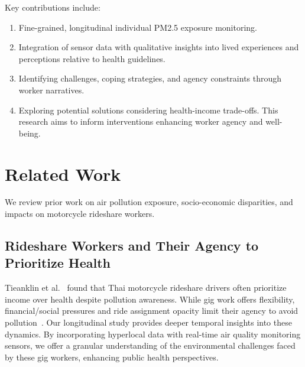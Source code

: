 \documentclass[sigconf,screen,natbib=true]{acmart}
\providecommand{\DIFaddbegin}{} %
\providecommand{\DIFaddend}{} %
\begin{document}
Key contributions include:
\begin{enumerate}
    \item 
Fine-grained, longitudinal individual PM2.5 exposure monitoring.
    \item 
Integration of sensor data with qualitative insights into lived experiences and perceptions relative to health guidelines.
    \item 
Identifying challenges, coping strategies, and agency constraints through worker narratives.
    \item 
Exploring potential solutions considering health-income trade-offs. This research aims to inform interventions enhancing worker agency and well-being.
\end{enumerate}




























%
 \section{Related Work}
We review prior work on air pollution exposure, socio-economic disparities, and impacts on motorcycle rideshare workers.
\DIFaddbegin {}
\DIFaddend 

\subsection{Rideshare Workers and Their Agency to Prioritize Health}




Tieanklin et al.~\cite{tieanklin2024rideshare} found that Thai motorcycle rideshare drivers often prioritize income over health despite pollution awareness.
While gig work offers flexibility, financial/social pressures and ride assignment opacity limit their agency to avoid pollution~\cite{machado2021midlife,elfassy2019associations}.
Our longitudinal study provides deeper temporal insights into these dynamics.
By incorporating hyperlocal data with real-time air quality monitoring sensors, we offer a granular understanding of the environmental challenges faced by these gig workers, enhancing public health perspectives.
\end{document}
